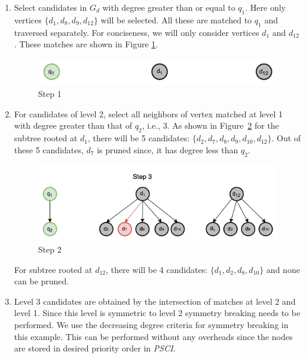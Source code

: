 \begin{enumerate}[Step 1:]
    \item Select candidates in $G_d$ with degree greater than or equal to $q_1$. Here only vertices $\{d_1, d_8, d_9, d_{12}\}$ will be selected. All these are matched to $q_1$ and traversed separately. For conciseness, we will only consider vertices $d_1$ and $d_{12}$. These matches are shown in Figure \ref{fig:sgm-step2}.
          \begin{figure}
              \includegraphics[width=\textwidth]{fig/LR/sgm-step2.png}
              \caption{Step 1}
              \label{fig:sgm-step2}
          \end{figure}
    \item For candidates of level 2, select all neighbors of vertex matched at level 1 with degree greater than that of $q_2$, i.e., 3. As shown in Figure\ \ref{fig:sgm-step3} for the subtree rooted at $d_1$, there will be 5 candidates: $\{d_2, d_7, d_8, d_9, d_{10}, d_{12}\}$. Out of these 5 candidates, $d_7$ is pruned since, it has degree less than $q_2$.\\
          \begin{figure}
              \includegraphics[width=\textwidth]{fig/LR/sgm-step3.png}
              \caption{Step 2}
              \label{fig:sgm-step3}
          \end{figure}
          For subtree rooted at $d_{12}$, there will be 4 candidates: $\{d_1, d_2, d_8, d_{10}\}$ and none can be pruned.
    \item Level 3 candidates are obtained by the intersection of matches at level 2 and level 1. Since this level is symmetric to level 2 symmetry breaking needs to be performed. We use the decreasing degree criteria for symmetry breaking in this example. This can be performed without any overheads since the nodes are stored in desired priority order in \textit{PSCI}.
          \begin{figure}

\end{figure}
\end{enumerate}
